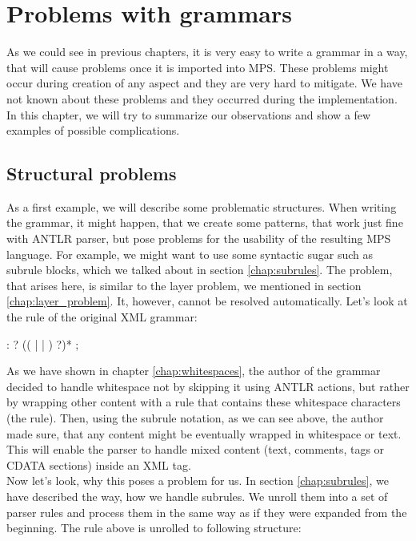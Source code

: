 \chapter{Problems with grammars}
\label{chap:problems_with_grammars}

As we could see in previous chapters, it is very easy to write a grammar in a way, that will cause problems once it is imported into MPS.
These problems might occur during creation of any aspect and they are very hard to mitigate.
We have not known about these problems and they occurred during the implementation.
In this chapter, we will try to summarize our observations and show a few examples of possible complications.
\\

\section{Structural problems}

As a first example, we will describe some problematic structures.
When writing the grammar, it might happen, that we create some patterns, that work just fine with ANTLR parser, but pose problems for the usability of the resulting MPS language.
For example, we might want to use some syntactic sugar such as subrule blocks, which we talked about in section \ref{chap:subrules}.
The problem, that arises here, is similar to the layer problem, we mentioned in section \ref{chap:layer_problem}.
It, however, cannot be resolved automatically.
Let's look at the  rule of the original XML grammar:

\begin{antlr}
	 :   ? (( |  | ) ?)* ;
\end{antlr}

As we have shown in chapter \ref{chap:whitespaces}, the author of the grammar decided to handle whitespace not by skipping it using ANTLR actions, but rather by wrapping other content with a rule that contains these whitespace characters (the  rule).
Then, using the subrule notation, as we can see above, the author made sure, that any content might be eventually wrapped in whitespace or text.
This will enable the parser to handle mixed content (text, comments, tags or CDATA sections) inside an XML tag.
\\

Now let's look, why this poses a problem for us.
In section \ref{chap:subrules}, we have described the way, how we handle subrules.
We unroll them into a set of parser rules and process them in the same way as if they were expanded from the beginning.
The rule above is unrolled to following structure:


